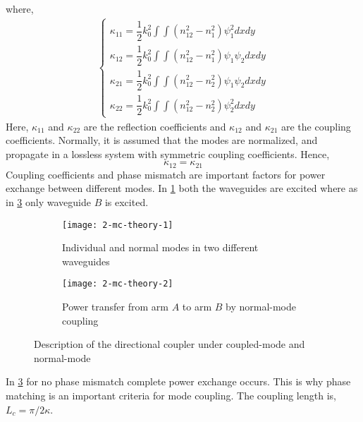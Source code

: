 \documentclass[../report.tex]{subfiles}
\begin{document}
where,
\begin{equation}\label{eq:coupled_mode_coupling_coeff}
\begin{aligned}
\begin{cases}
\kappa_{11} = \dfrac{1}{2}k_0^2\int\int(n_{12}^2-n_{1}^2)\psi_1^2dxdy \\[10pt]
\kappa_{12} = \dfrac{1}{2}k_0^2\int\int(n_{12}^2-n_{1}^2)\psi_1\psi_2 dxdy \\[10pt]
\kappa_{21} = \dfrac{1}{2}k_0^2\int\int(n_{12}^2-n_{2}^2)\psi_1\psi_2 dxdy \\[10pt]
\kappa_{22} = \dfrac{1}{2}k_0^2\int\int(n_{12}^2-n_{2}^2)\psi_2^2 dxdy
\end{cases}
\end{aligned}
\end{equation}	
Here, $\kappa_{11}$ and $\kappa_{22}$ are the reflection coefficients and $\kappa_{12}$ and $\kappa_{21}$ are the coupling coefficients. Normally, it is assumed that the modes are normalized, and propagate in a lossless system with symmetric coupling coefficients. Hence,
\begin{equation}\label{eq:symmetric_coupling_coeff}
\kappa_{12} = \kappa_{21} 
\end{equation}
Coupling coefficients and phase mismatch are important factors for power exchange between different modes. In \ref{fig:2_mc_theory_1} both the waveguides are excited where as in \ref{fig:2_mc_theory_2} only waveguide $B$ is excited.
\begin{figure}[H]
	\begin{subfigure}[t]{0.45\textwidth}
		\texttt{[image: 2-mc-theory-1]}
		\caption{Individual and normal modes in two different waveguides}
		\label{fig:2_mc_theory_1}
	\end{subfigure}
	\hfill
	\begin{subfigure}[t]{0.45\textwidth}
		\texttt{[image: 2-mc-theory-2]}
		\caption{Power transfer from arm $A$ to arm $B$ by normal-mode coupling}
		\label{fig:2_mc_theory_2}
	\end{subfigure}
	\caption{Description of the directional coupler under coupled-mode and normal-mode}
\end{figure}

\noindent In \ref{fig:2_mc_theory_2} for no phase mismatch complete power exchange occurs. This is why phase matching is an important criteria for mode coupling. The coupling length is, $L_c = \pi / 2\kappa$. 
\end{document}
